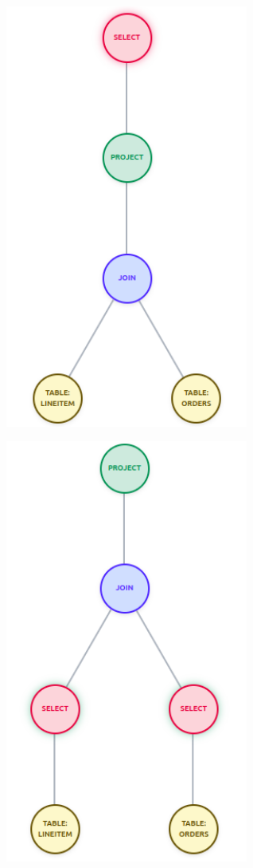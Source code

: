 \documentclass[12pt]{article}
\begin{document}
\vspace{-0.02in}
\begin{table}[H]
  \centering
   \begin{minipage}[t]{0.48\textwidth}
    \centering
    \includegraphics[width=0.6\textwidth]{images/pred_before.png}
  \end{minipage}
  \hfill
  \begin{minipage}[t]{0.48\textwidth}
    \centering
    \includegraphics[width=0.6\textwidth]{images/pred_after.png}
  \end{minipage}
\end{table}
\end{document}
